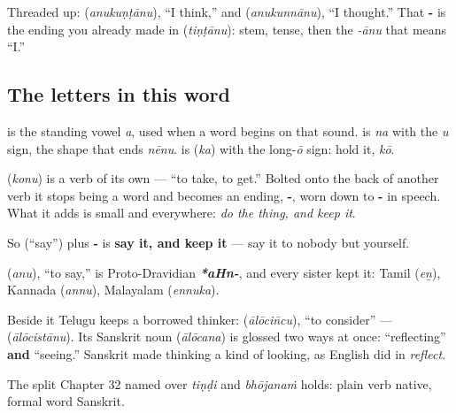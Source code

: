Threaded up: \textbf{} (\emph{anukuṇṭānu}), \textquotedblleft{}I think,\textquotedblright{} and \textbf{} (\emph{anukunnānu}), \textquotedblleft{}I thought.\textquotedblright{} That \textbf{-} is the ending you already made in \textbf{} (\emph{tiṇṭānu}): stem, tense, then the \emph{-ānu} that means \textquotedblleft{}I.\textquotedblright{}

\subsection*{The letters in this word}
\textbf{} is the standing vowel \emph{a}, used when a word begins on that sound. \textbf{} is \emph{na} with the \emph{u} sign, the shape that ends \emph{nēnu}. \textbf{} is \textbf{} (\emph{ka}) with the long-\emph{ō} sign: hold it, \emph{kō}.

\begin{grammarlens}[title={Grammar Lens: -\te{కో}, the ending that hands the verb back}]
\textbf{} (\emph{konu}) is a verb of its own — \textquotedblleft{}to take, to get.\textquotedblright{} Bolted onto the back of another verb it stops being a word and becomes an ending, \textbf{-}, worn down to \textbf{-} in speech. What it adds is small and everywhere: \emph{do the thing, and keep it}.

So \textbf{} (\textquotedblleft{}say\textquotedblright{}) plus \textbf{-} is \textbf{say it, and keep it} — say it to nobody but yourself.
\end{grammarlens}

\begin{cousinweb}
\textbf{} (\emph{anu}), \textquotedblleft{}to say,\textquotedblright{} is Proto-Dravidian \emph{\textbf{*aHn-}}, and every sister kept it: Tamil \textbf{} (\emph{eṉ}), Kannada \textbf{} (\emph{annu}), Malayalam \textbf{} (\emph{ennuka}).

Beside it Telugu keeps a borrowed thinker: \textbf{} (\emph{ālōcin̄cu}), \textquotedblleft{}to consider\textquotedblright{} — \textbf{} (\emph{ālōcistānu}). Its Sanskrit noun \textbf{} (\emph{ālōcana}) is glossed two ways at once: \textquotedblleft{}reflecting\textquotedblright{} \textbf{and} \textquotedblleft{}seeing.\textquotedblright{} Sanskrit made thinking a kind of looking, as English did in \emph{reflect}.

The split Chapter 32 named over \emph{tiṇḍi} and \emph{bhōjanaṁ} holds: plain verb native, formal word Sanskrit.
\end{cousinweb}


